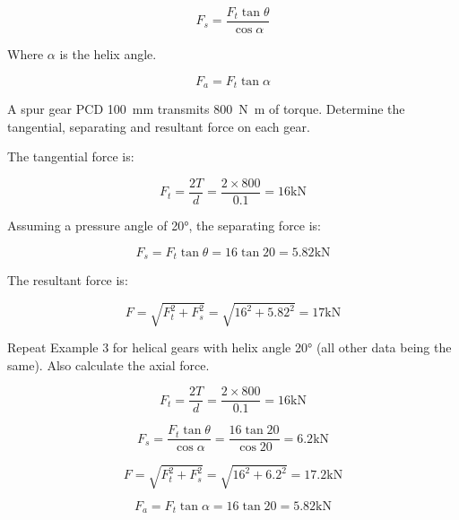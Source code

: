 \begin{equation}
  F_s = \frac{F_t\tan\theta}{\cos\alpha}
\end{equation}

Where $\alpha$ is the helix angle.


\begin{equation}
  F_a = F_t\tan\alpha
\end{equation}

A spur gear PCD \SI{100}{\milli\metre} transmits \SI{800}{\newton\metre} of torque. Determine the tangential, separating and resultant force on each gear.

The tangential force is:

\begin{equation}
  F_t = \frac{2T}{d} = \frac{2\times 800}{0.1} = 16\si{\kilo\newton}
\end{equation}

Assuming a pressure angle of \ang{20}, the separating force is:

\begin{equation}
  F_s = F_t\tan\theta = 16\tan20 = 5.82\si{\kilo\newton}
\end{equation}

The resultant force is:

\begin{equation}
  F = \sqrt{F_t^2+F_s^2} = \sqrt{16^2+5.82^2} = 17\si{\kilo\newton}
\end{equation}


Repeat Example 3 for helical gears with helix angle \ang{20} (all other data being the same). Also calculate the axial force.

\begin{equation}
  F_t = \frac{2T}{d} = \frac{2\times 800}{0.1} = 16\si{\kilo\newton}
\end{equation}

\begin{equation}
  F_s = \frac{F_t\tan\theta}{\cos\alpha} = \frac{16\tan20}{\cos20} = 6.2\si{\kilo\newton}
\end{equation}

\begin{equation}
  F = \sqrt{F_t^2+F_s^2}=\sqrt{16^2+6.2^2}=17.2\si{\kilo\newton}
\end{equation}

\begin{equation}
  F_a = F_t\tan\alpha=16\tan20 = 5.82\si{\kilo\newton}
\end{equation}
